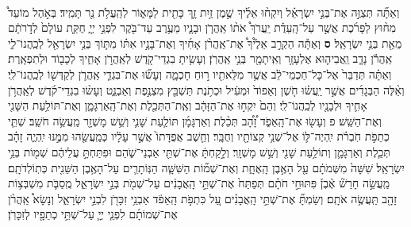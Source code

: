 \documentclass[twoside, openany, parskip=half, 11pt]{book}
\begin{document}
\begin{footnotesize}
\begin{multicols}{2}
\\
 וְאַתָּ֞ה תְּצַוֶּ֣ה אֶת־בְּנֵ֣י יִשְׂרָאֵ֗ל וְיִקְח֨וּ אֵלֶ֜יךָ שֶׁ֣מֶן זַ֥יִת זָ֛ךְ כָּתִ֖ית לַמָּא֑וֹר לְהַֽעֲלֹ֥ת נֵ֖ר תָּמִֽיד׃ בְּאֹ֣הֶל מוֹעֵד֩ מִח֨וּץ לַפָּרֹ֜כֶת אֲשֶׁ֣ר עַל־הָֽעֵדֻ֗ת יַֽעֲרֹךְ֩ אֹת֨וֹ אַֽהֲרֹ֧ן וּבָנָ֛יו מֵעֶ֥רֶב עַד־בֹּ֖קֶר לִפְנֵ֣י יְיָ֑ חֻקַּ֤ת עוֹלָם֙ לְדֹ֣רֹתָ֔ם מֵאֵ֖ת בְּנֵ֥י יִשְׂרָאֵֽל׃ \textbf{ס} וְאַתָּ֡ה הַקְרֵ֣ב אֵלֶ֩יךָ֩ אֶת־אַֽהֲרֹ֨ן אָחִ֜יךָ וְאֶת־בָּנָ֣יו אִתּ֗וֹ מִתּ֛וֹךְ בְּנֵ֥י יִשְׂרָאֵ֖ל לְכַֽהֲנוֹ־לִ֑י אַֽהֲרֹ֕ן נָדָ֧ב וַֽאֲבִיה֛וּא אֶלְעָזָ֥ר וְאִֽיתָמָ֖ר בְּנֵ֥י אַֽהֲרֹֽן׃ וְעָשִׂ֥יתָ בִגְדֵי־קֹ֖דֶשׁ לְאַֽהֲרֹ֣ן אָחִ֑יךָ לְכָב֖וֹד וּלְתִפְאָֽרֶת׃ 
 וְאַתָּ֗ה תְּדַבֵּר֙ אֶל־כָּל־חַכְמֵי־לֵ֔ב אֲשֶׁ֥ר מִלֵּאתִ֖יו ר֣וּחַ חָכְמָ֑ה וְעָשׂ֞וּ אֶת־בִּגְדֵ֧י אַֽהֲרֹ֛ן לְקַדְּשׁ֖וֹ לְכַֽהֲנוֹ־לִֽי׃ וְאֵ֨לֶּה הַבְּגָדִ֜ים אֲשֶׁ֣ר יַֽעֲשׂ֗וּ חֹ֤שֶׁן וְאֵפוֹד֙ וּמְעִ֔יל וּכְתֹ֥נֶת תַּשְׁבֵּ֖ץ מִצְנֶ֣פֶת וְאַבְנֵ֑ט וְעָשׂ֨וּ בִגְדֵי־קֹ֜דֶשׁ לְאַֽהֲרֹ֥ן אָחִ֛יךָ וּלְבָנָ֖יו לְכַֽהֲנוֹ־לִֽי׃ וְהֵם֙ יִקְח֣וּ אֶת־הַזָּהָ֔ב וְאֶֽת־הַתְּכֵ֖לֶת וְאֶת־הָֽאַרְגָּמָ֑ן וְאֶת־תּוֹלַ֥עַת הַשָּׁנִ֖י וְאֶת־הַשֵּֽׁשׁ׃ פ
וְעָשׂ֖וּ אֶת־הָֽאֵפֹ֑ד זָ֠הָ֠ב תְּכֵ֨לֶת וְאַרְגָּמָ֜ן תּוֹלַ֧עַת שָׁנִ֛י וְשֵׁ֥שׁ מָשְׁזָ֖ר מַֽעֲשֵׂ֥ה חֹשֵֽׁב׃ שְׁתֵּ֧י כְתֵפֹ֣ת חֹֽבְרֹ֗ת יִֽהְיֶה־לּ֛וֹ אֶל־שְׁנֵ֥י קְצוֹתָ֖יו וְחֻבָּֽר׃ וְחֵ֤שֶׁב אֲפֻדָּתוֹ֙ אֲשֶׁ֣ר עָלָ֔יו כְּמַֽעֲשֵׂ֖הוּ מִמֶּ֣נּוּ יִֽהְיֶ֑ה זָהָ֗ב תְּכֵ֧לֶת וְאַרְגָּמָ֛ן וְתוֹלַ֥עַת שָׁנִ֖י וְשֵׁ֥שׁ מָשְׁזָֽר׃ וְלָ֣קַחְתָּ֔ אֶת־שְׁתֵּ֖י אַבְנֵי־שֹׁ֑הַם וּפִתַּחְתָּ֣ עֲלֵיהֶ֔ם שְׁמ֖וֹת בְּנֵ֥י יִשְׂרָאֵֽל׃ 
 שִׁשָּׁה֙ מִשְּׁמֹתָ֔ם עַ֖ל הָאֶ֣בֶן הָֽאֶחָ֑ת וְאֶת־שְׁמ֞וֹת הַשִּׁשָּׁ֧ה הַנּֽוֹתָרִ֛ים עַל־הָאֶ֥בֶן הַשֵּׁנִ֖ית כְּתֽוֹלְדֹתָֽם׃ מַֽעֲשֵׂ֣ה חָרַשׁ֘ אֶ֒בֶן֒ פִּתּוּחֵ֣י חֹתָ֗ם תְּפַתַּח֙ אֶת־שְׁתֵּ֣י הָֽאֲבָנִ֔ים עַל־שְׁמֹ֖ת בְּנֵ֣י יִשְׂרָאֵ֑ל מֻֽסַבֹּ֛ת מִשְׁבְּצ֥וֹת זָהָ֖ב תַּֽעֲשֶׂ֥ה אֹתָֽם׃ וְשַׂמְתָּ֞ אֶת־שְׁתֵּ֣י הָֽאֲבָנִ֗ים עַ֚ל כִּתְפֹ֣ת הָֽאֵפֹ֔ד אַבְנֵ֥י זִכָּרֹ֖ן לִבְנֵ֣י יִשְׂרָאֵ֑ל וְנָשָׂא֩ אַֽהֲרֹ֨ן אֶת־שְׁמוֹתָ֜ם לִפְנֵ֧י יְיָ֛ עַל־שְׁתֵּ֥י כְתֵפָ֖יו לְזִכָּרֹֽן׃


\end{multicols}
\end{footnotesize}
\end{document}

